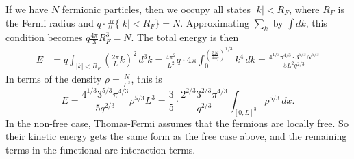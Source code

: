 \documentclass[11pt]{amsart}
\theoremstyle{definition}
\theoremstyle{definition}
\theoremstyle{definition}
\numberwithin{equation}{section}
\begin{document}
If we have $N$ fermionic particles, then we occupy all states $|k|<R_F$, where $R_F$ is the Fermi radius and $q\cdot\#\{|k|<R_F\}=N$. Approximating $\sum_k$ by $\int dk$, this condition becomes $q\frac{4\pi}{3}R_F^3=N$. The total energy is then
\begin{align*}
E&=q\int_{|k|<R_F}\left(\frac{2\pi}{L}k\right)^2\,d^3k=\frac{4\pi^2}{L^2}q\cdot 4\pi\int_0^{(\frac{3N}{4\pi q})^{1/3}}k^4\,dk=\frac{4^{1/3}\pi^{4/3}\cdot 3^{5/3}N^{5/3}}{5L^2q^{2/3}}
\end{align*}
In terms of the density $\rho=\frac{N}{L^3}$, this is
\[
E=\frac{4^{1/3}3^{5/3}\pi^{4/3}}{5q^{2/3}}\rho^{5/3}L^3=\frac{3}{5}\cdot\frac{2^{2/3}3^{2/3}\pi^{4/3}}{q^{2/3}}\int_{[0,L]^3}\rho^{5/3}\,dx.
\]
In the non-free case, Thomas-Fermi assumes that the fermions are locally free. So their kinetic energy gets the same form as the free case above, and the remaining terms in the functional are interaction terms.
\end{document}
